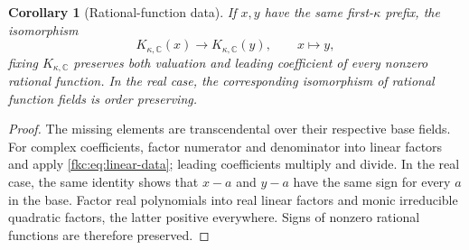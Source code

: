 \documentclass[11pt,letterpaper]{article}
\numberwithin{equation}{section}
\newtheorem{corollary}[theorem]{Corollary}
\theoremstyle{definition}
\theoremstyle{remark}
\newcommand{\C}{\mathbb C}
\newcommand{\KC}{K_{\kappa,\C}}
\begin{document}
\begin{corollary}[Rational-function data]\label{fkc:cor:rational}
If $x,y$ have the same first-$\kappa$ prefix, the isomorphism
\[
 \KC(x)\longrightarrow\KC(y),\qquad x\longmapsto y,
\]
fixing $\KC$ preserves both valuation and leading coefficient of every nonzero rational function. In the real case, the corresponding isomorphism of rational function fields is order preserving.
\end{corollary}
\begin{proof}
The missing elements are transcendental over their respective base fields. For complex coefficients, factor numerator and denominator into linear factors and apply \eqref{fkc:eq:linear-data}; leading coefficients multiply and divide. In the real case, the same identity shows that $x-a$ and $y-a$ have the same sign for every $a$ in the base. Factor real polynomials into real linear factors and monic irreducible quadratic factors, the latter positive everywhere. Signs of nonzero rational functions are therefore preserved.
\end{proof}
\end{document}

